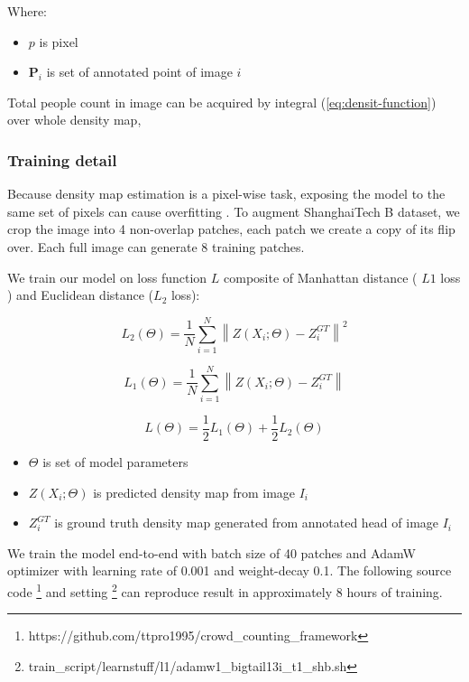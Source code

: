 Where: 
\begin{itemize}
  \item $p$ is pixel
  \item $\mathbf{P}_{i}$ is set of annotated point of image $i$
\end{itemize}

Total people count in image can be acquired by integral (\ref{eq:densit-function}) over whole density map,





\subsubsection{Training detail} \hfill

 Because density map estimation is a pixel-wise task, exposing the model to the same set of pixels can cause overfitting \cite{marsden2016fully}. To augment ShanghaiTech B dataset, we crop the image into 4 non-overlap patches, each patch we create a copy of its flip over. Each full image can generate 8 training patches. 

We train our model on loss function $L$ composite of Manhattan distance ( $L1$ loss ) and Euclidean distance ($L_2$ loss): 

\begin{equation}L_2(\Theta)=\frac{1}{N} \sum_{i=1}^{N}\left\|Z\left(X_{i} ; \Theta\right)-Z_{i}^{G T}\right\|^{2}\end{equation}

\begin{equation}L_1(\Theta)=\frac{1}{N} \sum_{i=1}^{N}\left\|Z\left(X_{i} ; \Theta\right)-Z_{i}^{G T}\right\|\end{equation}

\begin{equation}
    L(\Theta) = \frac{1}{2}L_1(\Theta) + \frac{1}{2}L_2(\Theta)
\end{equation}

\begin{itemize}
  \item $\Theta$ is set of model parameters
  \item $Z\left(X_{i} ; \Theta\right)$ is predicted density map from image $I_i$
  \item $Z_{i}^{G T}$ is ground truth density map generated from annotated head of image $I_i$
\end{itemize}

 
 We train the model end-to-end with batch size of 40 patches and AdamW optimizer \cite{loshchilov2017decoupled} with learning rate of 0.001 and weight-decay 0.1. The following source code \footnote{https://github.com/ttpro1995/crowd\_counting\_framework} and setting \footnote{train\_script/learnstuff/l1/adamw1\_bigtail13i\_t1\_shb.sh} can reproduce result in approximately 8 hours of training.








